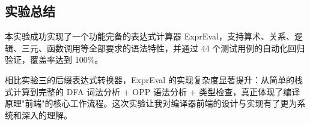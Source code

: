 \documentclass[a4paper]{article}
\begin{document}
\subsection{实验总结}

本实验成功实现了一个功能完备的表达式计算器 ExprEval，支持算术、关系、逻辑、三元、函数调用等全部要求的语法特性，并通过 44 个测试用例的自动化回归验证，覆盖率达到 100\%。

相比实验三的后缀表达式转换器，ExprEval 的实现复杂度显著提升：从简单的栈式计算到完整的 DFA 词法分析 + OPP 语法分析 + 类型检查，真正体现了编译原理"前端"的核心工作流程。这次实验让我对编译器前端的设计与实现有了更为系统和深入的理解。
\end{document}
